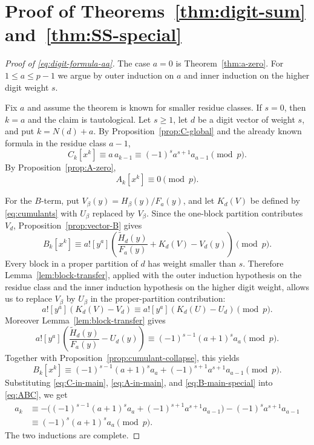 \documentclass[11pt]{amsart}
\numberwithin{equation}{section}
\begin{document}
\section{Proof of \texorpdfstring{Theorems~\ref{thm:digit-sum} and~\ref{thm:SS-special}}{Theorems 1.1 and 1.2}}\label{sec:proof-main-special}
\begin{proof}[Proof of \eqref{eq:digit-formula-aa}]
The case $a=0$ is Theorem~\ref{thm:a-zero}.  For $1\le a\le p-1$ we argue by outer induction on $a$ and inner induction on the higher digit weight $s$.

Fix $a$ and assume the theorem is known for smaller residue classes.  If $s=0$, then $k=a$ and the claim is tautological.  Let $s\ge1$, let $d$ be a digit vector of weight $s$, and put $k=N(d)+a$.  By Proposition~\ref{prop:C-global} and the already known formula in the residue class $a-1$,
\begin{equation}\label{eq:C-in-main}
        C_k[x^k]\equiv a\,a_{k-1}\equiv (-1)^s a^{s+1}a_{a-1}\pmod p.
\end{equation}
By Proposition~\ref{prop:A-zero},
\begin{equation}\label{eq:A-in-main}
        A_k[x^k]\equiv0\pmod p.
\end{equation}

For the $B$-term, put $V_\beta(y)=H_\beta(y)/F_a(y)$, and let $K_d(V)$ be defined by \eqref{eq:cumulants} with $U_\beta$ replaced by $V_\beta$.  Since the one-block partition contributes $V_d$, Proposition~\ref{prop:vector-B} gives
\begin{equation}\label{eq:B-cumulant-main}
        B_k[x^k]\equiv a![y^a]\left(\frac{\widetilde H_d(y)}{F_a(y)}+K_d(V)-V_d(y)\right)\pmod p.
\end{equation}
Every block in a proper partition of $d$ has weight smaller than $s$.  Therefore Lemma~\ref{lem:block-transfer}, applied with the outer induction hypothesis on the residue class and the inner induction hypothesis on the higher digit weight, allows us to replace $V_\beta$ by $U_\beta$ in the proper-partition contribution:
\[
        a![y^a](K_d(V)-V_d)\equiv a![y^a](K_d(U)-U_d)\pmod p.
\]
Moreover Lemma~\ref{lem:block-transfer} gives
\[
        a![y^a]\left(\frac{\widetilde H_d(y)}{F_a(y)}-U_d(y)\right)
        \equiv (-1)^{s-1}(a+1)^s a_a\pmod p.
\]
Together with Proposition~\ref{prop:cumulant-collapse}, this yields
\begin{equation}\label{eq:B-main-special}
        B_k[x^k]\equiv
        (-1)^{s-1}(a+1)^sa_a+(-1)^{s+1}a^{s+1}a_{a-1}\pmod p.
\end{equation}
Substituting \eqref{eq:C-in-main}, \eqref{eq:A-in-main}, and \eqref{eq:B-main-special} into \eqref{eq:ABC}, we get
\[
\begin{aligned}
        a_k
        &\equiv-\bigl((-1)^{s-1}(a+1)^sa_a+(-1)^{s+1}a^{s+1}a_{a-1}\bigr)
        -(-1)^s a^{s+1}a_{a-1}       \\
        &\equiv (-1)^s(a+1)^sa_a\pmod p.
\end{aligned}
\]
The two inductions are complete.
\end{proof}
\end{document}

